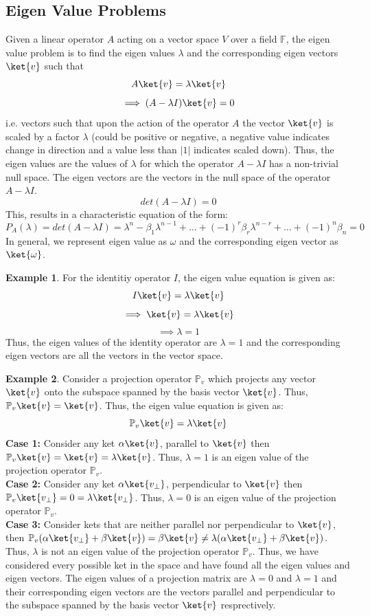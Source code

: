 \documentclass[12pt, oneside]{book}
\theoremstyle{definition}
\theoremstyle{definition}
\newtheorem{example}{Example}[section]
\theoremstyle{remark}
\begin{document}
\subsection{Eigen Value Problems}
Given a linear operator $A$ acting on a vector space $V$ over a field $\mathbb{F}$, the eigen value problem is to find the eigen values $\lambda$ and the corresponding eigen vectors $\ket{v}$ such that
\[A\ket{v}=\lambda\ket{v}\]
\[\implies (A-\lambda I)\ket{v}=0\]
i.e. vectors such that upon the action of the operator $A$ the vector $\ket{v}$ is scaled by a factor $\lambda$ (could be positive or negative, a negative value indicates change in direction and a value less than $|1|$ indicates scaled
down).
Thus, the eigen values are the values of $\lambda$ for which the operator $A-\lambda I$ has a non-trivial null space. The eigen vectors are the vectors in the null space of the operator $A-\lambda I$.
\[det(A-\lambda I)=0\]
This, results in a characteristic equation of the form:
\[ P_A(\lambda)=det(A-\lambda I)=\lambda^n - \beta_1\lambda^{n-1} + \ldots + (-1)^{r} \beta_r\lambda^{n-r}+\ldots + (-1)^n\beta_n = 0 \]
In general, we represent eigen value as $\omega$ and the corresponding eigen vector as $\ket{\omega}$.

\begin{example}
    For the identitiy operator $I$, the eigen value equation is given as:
    \[I\ket{v}=\lambda\ket{v}\]
    \[\implies \ket{v}=\lambda\ket{v}\]
    \[\implies \lambda=1\]
    Thus, the eigen values of the identity operator are $\lambda=1$ and the corresponding eigen vectors are all the vectors in the vector space.
\end{example}

\begin{example}
    Consider a projection operator $\mathbb{P}_v$ which projects any vector $\ket{v}$ onto the subspace spanned by the basis vector $\ket{v}$. Thus, $\mathbb{P}_v\ket{v}=\ket{v}$. Thus, the eigen value equation is given as:
    \[\mathbb{P}_v\ket{v}=\lambda\ket{v}\]
    \textbf{Case 1:} Consider any ket $\alpha \ket{v}$, parallel to $\ket{v}$ then $\mathbb{P}_v\ket{v}=\ket{v}=\lambda\ket{v}$. Thus, $\lambda=1$ is an eigen value of the projection operator $\mathbb{P}_v$.\\
    \textbf{Case 2:} Consider any ket $\alpha \ket{v_{\perp}}$, perpendicular to $\ket{v}$ then $\mathbb{P}_v\ket{v_{\perp}}=0=\lambda\ket{v_{\perp}}$. Thus, $\lambda=0$ is an eigen value of the projection operator $\mathbb{P}_v$.\\
    \textbf{Case 3:} Consider kets that are neither parallel nor perpendicular to $\ket{v}$, then $\mathbb{P}_v(\alpha \ket{v_{\perp}}+\beta \ket{v})=\beta \ket{v} \neq \lambda(\alpha \ket{v_{\perp}} + \beta \ket{v})$. Thus, $\lambda$ is not an eigen value of the projection operator $\mathbb{P}_v$.
    Thus, we have considered every possible ket in the space and have found all the eigen values and eigen vectors. The eigen values of a projection matrix
    are $\lambda=0$ and $\lambda=1$ and their corresponding eigen vectors are the vectors parallel and perpendicular to the subspace spanned by the basis vector $\ket{v}$ resprectively.
\end{example}
\end{document}
